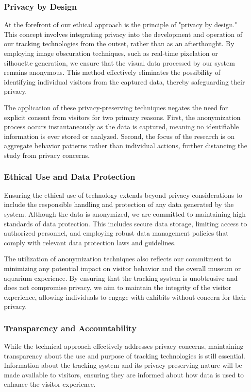 \subsubsection{Privacy by Design}
At the forefront of our ethical approach is the principle of "privacy by design." This concept involves integrating privacy into the development and operation of our tracking technologies from the outset, rather than as an afterthought. By employing image obscuration techniques, such as real-time pixelation or silhouette generation, we ensure that the visual data processed by our system remains anonymous. This method effectively eliminates the possibility of identifying individual visitors from the captured data, thereby safeguarding their privacy.

The application of these privacy-preserving techniques negates the need for explicit consent from visitors for two primary reasons. First, the anonymization process occurs instantaneously as the data is captured, meaning no identifiable information is ever stored or analyzed. Second, the focus of the research is on aggregate behavior patterns rather than individual actions, further distancing the study from privacy concerns.

\subsubsection{Ethical Use and Data Protection}
Ensuring the ethical use of technology extends beyond privacy considerations to include the responsible handling and protection of any data generated by the system. Although the data is anonymized, we are committed to maintaining high standards of data protection. This includes secure data storage, limiting access to authorized personnel, and employing robust data management policies that comply with relevant data protection laws and guidelines. 

The utilization of anonymization techniques also reflects our commitment to minimizing any potential impact on visitor behavior and the overall museum or aquarium experience. By ensuring that the tracking system is unobtrusive and does not compromise privacy, we aim to maintain the integrity of the visitor experience, allowing individuals to engage with exhibits without concern for their privacy.

\subsubsection{Transparency and Accountability}
While the technical approach effectively addresses privacy concerns, maintaining transparency about the use and purpose of tracking technologies is still essential. Information about the tracking system and its privacy-preserving nature will be made available to visitors, ensuring they are informed about how data is used to enhance the visitor experience.

